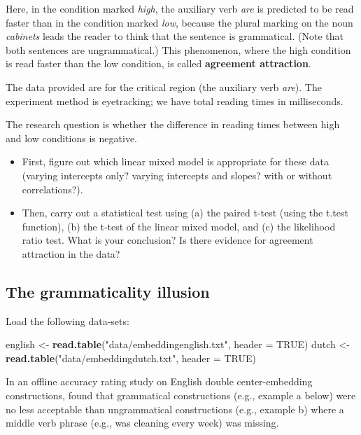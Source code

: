 \documentclass[12pt,]{krantz}
\newenvironment{Shaded}{\begin{snugshade}}{\end{snugshade}}
\newcommand{\DataTypeTok}[1]{\textcolor[rgb]{0.13,0.29,0.53}{#1}}
\newcommand{\KeywordTok}[1]{\textcolor[rgb]{0.13,0.29,0.53}{\textbf{#1}}}
\newcommand{\NormalTok}[1]{#1}
\newcommand{\OtherTok}[1]{\textcolor[rgb]{0.56,0.35,0.01}{#1}}
\newcommand{\StringTok}[1]{\textcolor[rgb]{0.31,0.60,0.02}{#1}}
\providecommand{\tightlist}{%
  \setlength{\itemsep}{0pt}\setlength{\parskip}{0pt}}
\begin{document}
Here, in the condition marked \emph{high}, the auxiliary verb \emph{are} is predicted to be read faster than in the condition marked \emph{low}, because the plural marking on the noun \emph{cabinets} leads the reader to think that the sentence is grammatical. (Note that both sentences are ungrammatical.) This phenomenon, where the high condition is read faster than the low condition, is called \textbf{agreement attraction}.

The data provided are for the critical region (the auxiliary verb \emph{are}). The experiment method is eyetracking; we have total reading times in milliseconds.

The research question is whether the difference in reading times between high and low conditions is negative.

\begin{itemize}
\tightlist
\item
  First, figure out which linear mixed model is appropriate for these data (varying intercepts only? varying intercepts and slopes? with or without correlations?).
\item
  Then, carry out a statistical test using (a) the paired t-test (using the t.test function), (b) the t-test of the linear mixed model, and (c) the likelihood ratio test. What is your conclusion? Is there evidence for agreement attraction in the data?
\end{itemize}

\hypertarget{sec:HypTestExerciseGramCE}{%
\subsection{The grammaticality illusion}\label{sec:HypTestExerciseGramCE}}

Load the following data-sets:

\begin{Shaded}
\begin{Highlighting}[]
\NormalTok{english <-}\StringTok{ }\KeywordTok{read.table}\NormalTok{(}\StringTok{"data/embeddingenglish.txt"}\NormalTok{, }
  \DataTypeTok{header =} \OtherTok{TRUE}\NormalTok{)}
\NormalTok{dutch <-}\StringTok{ }\KeywordTok{read.table}\NormalTok{(}\StringTok{"data/embeddingdutch.txt"}\NormalTok{, }\DataTypeTok{header =} \OtherTok{TRUE}\NormalTok{)}
\end{Highlighting}
\end{Shaded}

In an offline accuracy rating study on English double center-embedding constructions, \citet{gibsonthomas99} found that grammatical constructions (e.g., example a below) were no less acceptable than ungrammatical constructions (e.g., example b) where a middle verb phrase (e.g., was cleaning every week) was missing.
\end{document}
